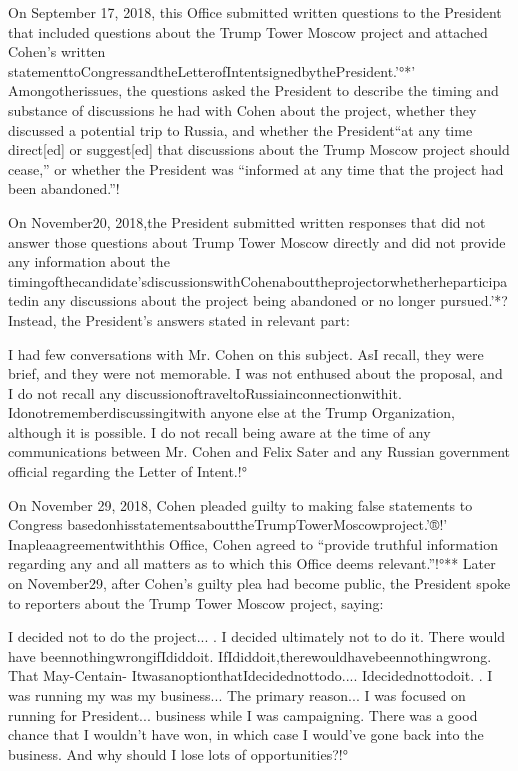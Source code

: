 On September 17, 2018, this Office submitted written questions to the President that included questions about the Trump Tower Moscow project and attached Cohen's written statementtoCongressandtheLetterofIntentsignedbythePresident.'°*' Amongotherissues, the questions asked the President to describe the timing and substance of discussions he had with Cohen about the project, whether they discussed a potential trip to Russia, and whether the President“at any time direct[ed] or suggest[ed] that discussions about the Trump Moscow project should cease,” or whether the President was “informed at any time that the project had been abandoned.”!%

On November20, 2018,the President submitted written responses that did not answer those questions about Trump Tower Moscow directly and did not provide any information about the timingofthecandidate'sdiscussionswithCohenabouttheprojectorwhetherheparticipatedin any discussions about the project being abandoned or no longer pursued.'*? Instead, the President's answers stated in relevant part:

I had few conversations with Mr. Cohen on this subject. AsI recall, they were brief, and they were not memorable. I was not enthused about the proposal, and I do not recall any discussionoftraveltoRussiainconnectionwithit. Idonotrememberdiscussingitwith anyone else at the Trump Organization, although it is possible. I do not recall being aware at the time of any communications between Mr. Cohen and Felix Sater and any Russian government official regarding the Letter of Intent.!°

On November 29, 2018, Cohen pleaded guilty to making false statements to Congress basedonhisstatementsabouttheTrumpTowerMoscowproject.'®!' Inapleaagreementwiththis Office, Cohen agreed to “provide truthful information regarding any and all matters as to which this Office deems relevant.”!°** Later on November29, after Cohen's guilty plea had become public, the President spoke to reporters about the Trump Tower Moscow project, saying:

I decided not to do the project... . I decided ultimately not to do it. There would have beennothingwrongifIdiddoit. IfIdiddoit,therewouldhavebeennothingwrong. That
May-Centain-
ItwasanoptionthatIdecidednottodo.... Idecidednottodoit. . I was running my
was my business...
The primary reason... I was focused on running for President...
business while I was campaigning. There was a good chance that I wouldn't have won, in which case I would've gone back into the business. And why should I lose lots of opportunities?!°

